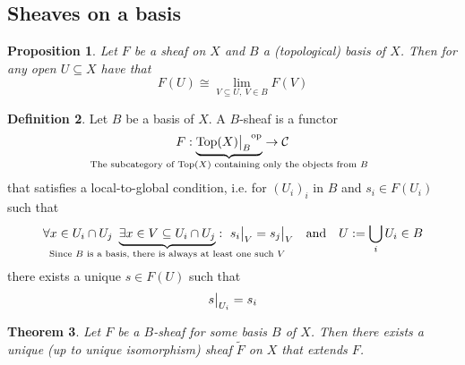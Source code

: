 \documentclass{scrartcl}
\newcommand{\Top}{\mathrm{Top}}
\newcommand\restr[2]{{
    \left.\kern-\nulldelimiterspace
    #1
    \vphantom{\big|}
    \right|_{#2}
}}
\newtheorem{prop}{Proposition}[section]
\newtheorem{theorem}[prop]{Theorem}
\theoremstyle{definition}
\newtheorem{definition}[prop]{Definition}
\begin{document}
\subsection{Sheaves on a basis}
\begin{prop}
    Let $F$ be a sheaf on $X$ and $B$ a (topological) basis of $X$.
    Then for any open $U \subseteq X$ have that
    \begin{equation*}
        F(U) \cong \lim_{V \subseteq U, \ V \in B} F(V)
    \end{equation*}
\end{prop}
\begin{definition}
    Let $B$ be a basis of $X$.
    A $B$-sheaf is a functor
    \begin{equation*}
        F: \underbrace{\restr{\Top(X)}{B}^{\mathrm{op}}}_{\mathclap{\text{The subcategory of $\Top(X)$ containing only the objects from $B$}}} \to \mathcal{C}
    \end{equation*}
    that satisfies a local-to-global condition, i.e. for $(U_i)_i$ in $B$ and $s_i \in F(U_i)$ such that
    \begin{equation*}
        \forall x \in U_i \cap U_j \ \underbrace{\exists x \in V \subseteq U_i \cap U_j}_{\mathclap{\text{Since $B$ is a basis, there is always at least one such $V$}}}: \ \restr{s_i}{V} = \restr{s_j}{V} \quad \text{and} \quad U := \bigcup_i U_i \in B
    \end{equation*}
    there exists a unique $s \in F(U)$ such that
    \begin{equation*}
        \restr{s}{U_i} = s_i
    \end{equation*}
\end{definition}
\begin{theorem}
    \label{prop:extend_b_sheaves}
    Let $F$ be a $B$-sheaf for some basis $B$ of $X$.
    Then there exists a unique (up to unique isomorphism) sheaf $\tilde{F}$ on $X$ that extends $F$.
\end{theorem}
\end{document}
